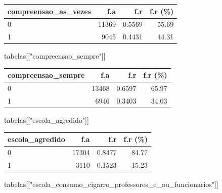 \documentclass[
]{article}
\newenvironment{Shaded}{\begin{snugshade}}{\end{snugshade}}
\newcommand{\NormalTok}[1]{\textcolor[rgb]{0.00,0.23,0.31}{#1}}
\newcommand{\StringTok}[1]{\textcolor[rgb]{0.13,0.47,0.30}{#1}}
\begin{document}
\begin{longtable}[]{@{}lrrr@{}}
\toprule()
compreensao\_as\_vezes & f.a & f.r & f.r (\%) \\
\midrule()
\endhead
0 & 11369 & 0.5569 & 55.69 \\
1 & 9045 & 0.4431 & 44.31 \\
\bottomrule()
\end{longtable}

\begin{Shaded}
\begin{Highlighting}[]
\NormalTok{tabelas[[}\StringTok{"compreensao\_sempre"}\NormalTok{]]}
\end{Highlighting}
\end{Shaded}

\begin{longtable}[]{@{}lrrr@{}}
\toprule()
compreensao\_sempre & f.a & f.r & f.r (\%) \\
\midrule()
\endhead
0 & 13468 & 0.6597 & 65.97 \\
1 & 6946 & 0.3403 & 34.03 \\
\bottomrule()
\end{longtable}

\begin{Shaded}
\begin{Highlighting}[]
\NormalTok{tabelas[[}\StringTok{"escola\_agredido"}\NormalTok{]]}
\end{Highlighting}
\end{Shaded}

\begin{longtable}[]{@{}lrrr@{}}
\toprule()
escola\_agredido & f.a & f.r & f.r (\%) \\
\midrule()
\endhead
0 & 17304 & 0.8477 & 84.77 \\
1 & 3110 & 0.1523 & 15.23 \\
\bottomrule()
\end{longtable}

\begin{Shaded}
\begin{Highlighting}[]
\NormalTok{tabelas[[}\StringTok{"escola\_consumo\_cigarro\_professores\_e\_ou\_funcionarios"}\NormalTok{]]}
\end{Highlighting}
\end{Shaded}
\end{document}

